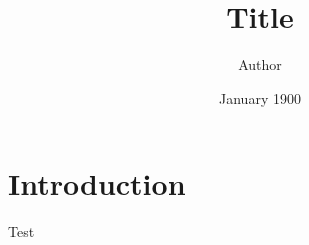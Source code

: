 \documentclass{article}
\title{Title}
\author{Author}
\date{January 1900}
\begin{document}
\maketitle

\section{Introduction}
Test
\end{document}
